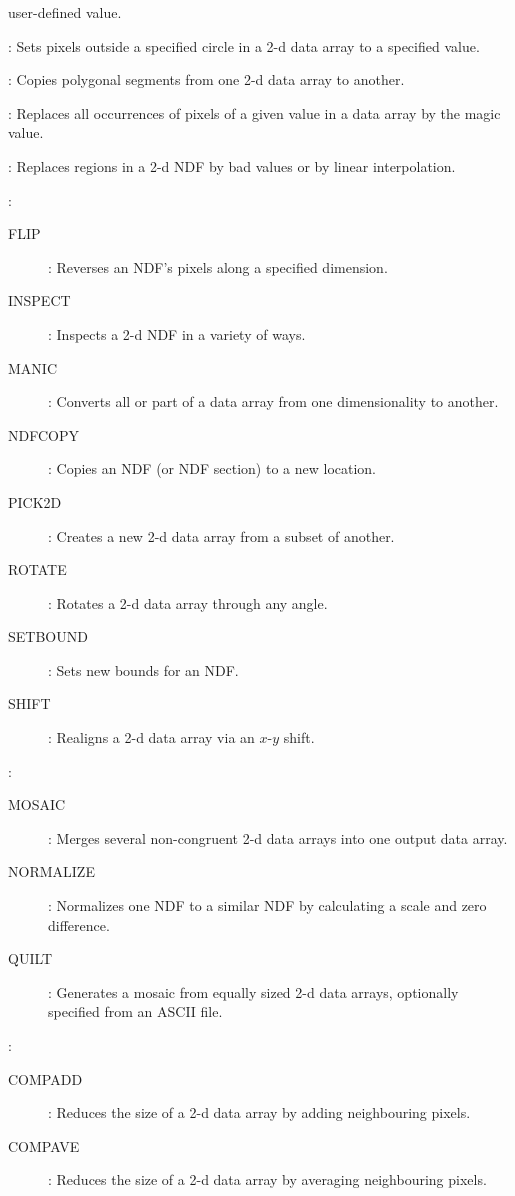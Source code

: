 {\begin{small}
\begin{description}
\begin {description}
\begin{description}
 user-defined value.
\item [OUTSET]:
 Sets pixels outside a specified circle in a 2-d data array to a specified
 value.
\item [SEGMENT]:
 Copies polygonal segments from one 2-d data array to another.
\item [SETMAGIC]:
 Replaces all occurrences of pixels of a given value in a
 data array by the magic value.
\item [ZAPLIN]:
 Replaces regions in a 2-d NDF by bad values or by linear
 interpolation.
\end{description}
\item [Configuration change]:
\begin{description}
\item [FLIP]:
 Reverses an NDF's pixels along a specified dimension.
\item [INSPECT]:
 Inspects a 2-d NDF in a variety of ways.
\item [MANIC]:
 Converts all or part of a data array from one dimensionality to another.
\item [NDFCOPY]:
 Copies an NDF (or NDF section) to a new location.
\item [PICK2D]:
 Creates a new 2-d data array from a subset of another.
\item [ROTATE]:
 Rotates a 2-d data array through any angle.
\item [SETBOUND]:
 Sets new bounds for an NDF.
\item [SHIFT]:
 Realigns a 2-d data array via an $x$-$y$ shift.
\end{description}
\item [Combination]:
\begin{description}
\item [MOSAIC]:
 Merges several non-congruent 2-d data arrays into one output data array.
\item [NORMALIZE]:
 Normalizes one NDF to a similar NDF by calculating a
 scale and zero difference.
\item [QUILT]:
 Generates a mosaic from equally sized 2-d data arrays, optionally specified
 from an ASCII file.
\end{description}
\item [Compression and Expansion] :
\begin {description}
\item [COMPADD]:
 Reduces the size of a 2-d data array by adding neighbouring pixels.
\item [COMPAVE]:
 Reduces the size of a 2-d data array by averaging neighbouring pixels.

\end{description}
\end{description}
\end{description}
\end{small}}
